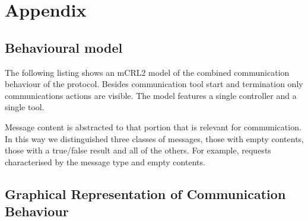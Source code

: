 \documentclass{article}
\begin{document}
%
%

  \enlargethispage*{4pt}
  

  \appendix
  \section{Appendix}
  \pagestyle{empty}

  \subsection{Behavioural model}
   The following listing shows an mCRL2 model of the combined communication
   behaviour of the protocol. Besides communication tool start and termination
   only communications actions are visible. The model features a single
   controller and a single tool.

  \small  \normalsize
   Message content is abstracted to that portion that is relevant for
   communication. In this way we distinguished three classes of messages, those
   with empty contents, those with a true/false result and all of the others.
   For example, requests characterised by the message type and empty
   contents.

  \pagebreak

  \subsection{Graphical Representation of Communication Behaviour}
\end{document}
